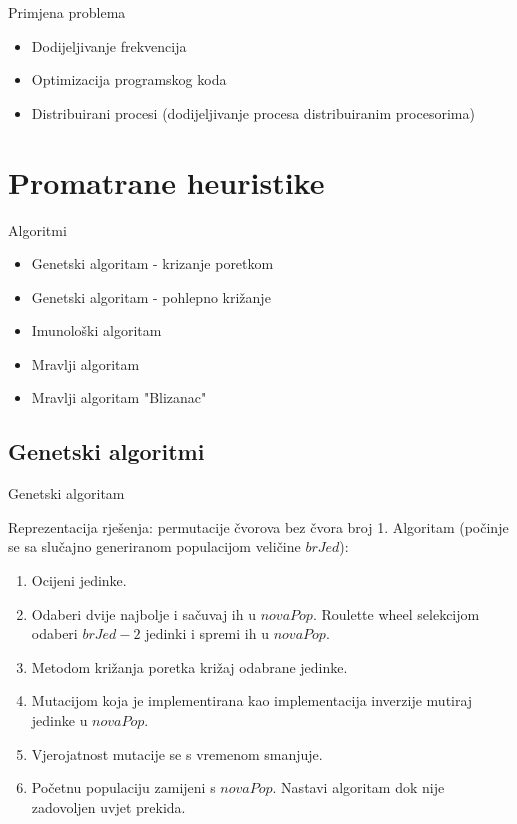 \documentclass{beamer}
\begin{document}
\begin{frame}{Primjena problema}

\begin{itemize}
\item Dodijeljivanje frekvencija 
\item Optimizacija programskog koda
\item Distribuirani procesi (dodijeljivanje procesa distribuiranim procesorima)
\end{itemize}

\end{frame}

\section{Promatrane heuristike}
\begin{frame}{Algoritmi}

\begin{itemize}
\item Genetski algoritam - krizanje poretkom
\item Genetski algoritam - pohlepno kri\v{z}anje
\item Imunolo\v{s}ki algoritam
\item Mravlji algoritam 
\item Mravlji algoritam "Blizanac"

\end{itemize}

\end{frame}

\subsection{Genetski algoritmi}
\begin{frame}{Genetski algoritam}

Reprezentacija rje\v{s}enja: permutacije \v{c}vorova bez \v{c}vora broj 1.
Algoritam (po\v{c}inje se sa slu\v{c}ajno generiranom populacijom veli\v{c}ine $brJed$): \\
\begin{enumerate}
\item Ocijeni jedinke.
\item Odaberi dvije najbolje i sa\v{c}uvaj ih u $novaPop$. Roulette wheel selekcijom odaberi $brJed - 2$ jedinki i spremi ih u $novaPop$.
\item Metodom kri\v{z}anja poretka kri\v{z}aj odabrane jedinke.
\item Mutacijom koja je implementirana kao implementacija inverzije mutiraj jedinke u $novaPop$.
\item Vjerojatnost mutacije se s vremenom smanjuje.
\item Po\v{c}etnu populaciju zamijeni s $novaPop$. Nastavi algoritam dok nije zadovoljen uvjet prekida.
\end{enumerate}

\end{frame}
\end{document}
